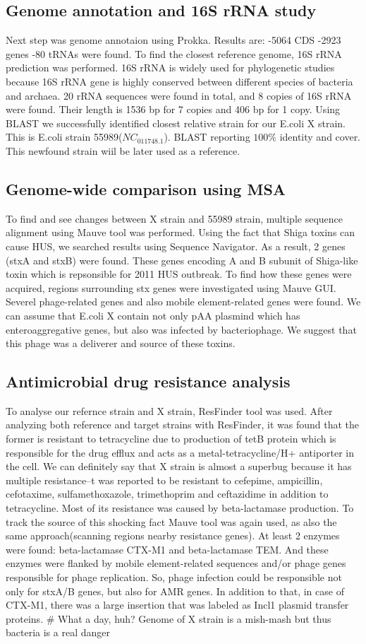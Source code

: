 \documentclass{article}
\begin{document}
\subsection{Genome annotation and 16S rRNA study}
Next step was genome annotaion using Prokka. Results are:
-5064 CDS
-2923 genes
-80 tRNAs were found.
To find the closest reference genome, 16S rRNA prediction was performed. 16S rRNA is widely used for phylogenetic studies because 16S rRNA gene is highly conserved between different species of bacteria and archaea.
20 rRNA sequences were found in total, and 8 copies of 16S rRNA were found. Their length is 1536 bp for 7 copies and 406 bp for 1 copy. Using BLAST we successfully identified closest relative strain for our E.coli X strain. This is E.coli strain 55989($NC_011748.1$). BLAST reporting $100\%$ identity and cover. This newfound strain wiil be later used as a reference.
\subsection{ Genome-wide comparison using MSA} 
To find and see changes between X strain and 55989 strain, multiple sequence alignment using Mauve tool was performed. Using the fact that Shiga toxins can cause HUS, we searched results using Sequence Navigator. As a result, 2 genes (stxA and stxB) were found. These genes encoding A and B subunit of Shiga-like toxin which is repsonsible for 2011 HUS outbreak. To find how these genes were acquired, regions surrounding stx genes were investigated using Mauve GUI. Severel phage-related genes and also mobile element-related genes were found. We can assume that E.coli X contain not only pAA plasmind which has enteroaggregative genes, but also was infected by bacteriophage. We suggest that this phage was a deliverer and source of these toxins.
\subsection{Antimicrobial drug resistance analysis}
To analyse our refernce strain and X strain, ResFinder tool was used.
After analyzing both reference and target strains with ResFinder, it was found that the former is resistant to tetracycline due to production of tetB protein which is responsible for the drug efflux and acts as a metal-tetracycline/H+ antiporter in the cell. We can definitely say that X strain is almost a superbug because it has multiple resistance--t was reported to be resistant to cefepime, ampicillin, cefotaxime, sulfamethoxazole, trimethoprim and ceftazidime in addition to tetracycline. Most of its resistance was caused by beta-lactamase production. To track the source of this shocking fact Mauve tool was again used, as also the same approach(scanning regions nearby resistance genes). At least 2 enzymes were found: beta-lactamase CTX-M1 and beta-lactamase TEM. And these enzymes were flanked by mobile element-related sequences and/or phage genes responsible for phage replication. So, phage infection could be responsible not only for stxA/B genes, but also for AMR genes. In addition to that, in case of CTX-M1, there was a large insertion that was labeled as Incl1 plasmid transfer proteins. \# What a day, huh? Genome of X strain is a mish-mash but thus bacteria is a real danger
\end{document}
